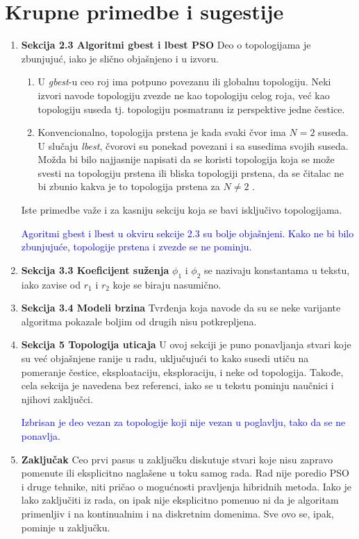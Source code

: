 \documentclass[a4paper]{report}
\newcommand{\odgovor}[1]{\textcolor{blue}{#1}}
\begin{document}
\section{Krupne primedbe i sugestije}
\begin{enumerate}
    \item \textbf{Sekcija 2.3 Algoritmi gbest i lbest PSO} Deo o topologijama je zbunjujuć, iako je slično objašnjeno i u izvoru.
    \begin{enumerate}
        \item U \textit{gbest}-u ceo roj ima potpuno povezanu ili globalnu topologiju. Neki izvori navode topologiju zvezde ne kao topologiju celog roja, već kao topologiju suseda tj. topologiju posmatranu iz perspektive jedne čestice.
        \item Konvencionalno, topologija prstena je kada svaki čvor ima $N=2$ suseda. U slučaju \textit{lbest}, čvorovi su ponekad povezani i sa susedima svojih suseda. Možda bi bilo najjasnije napisati da se koristi topologija koja se može svesti na topologiju prstena ili bliska topologiji prstena, da se čitalac ne bi zbunio kakva je to topologija prstena za $N\neq 2$ .
    \end{enumerate}
    Iste primedbe važe i za kasniju sekciju koja se bavi isključivo topologijama.
    
    
    \odgovor{Agoritmi gbest i lbest u okviru sekcije 2.3 su bolje objašnjeni. Kako ne bi bilo zbunjujuće, topologije prstena i zvezde se ne pominju. } 
    
    
    
    \item \textbf{Sekcija 3.3 Koeficijent suženja} $\phi_1$ i $\phi_2$ se nazivaju konstantama u tekstu, iako zavise od $r_1$ i $r_2$ koje se biraju nasumično.
    
    \item \textbf{Sekcija 3.4 Modeli brzina} Tvrđenja koja navode da su se neke varijante algoritma pokazale boljim od drugih nisu potkrepljena.
    
    \item \textbf{Sekcija 5 Topologija uticaja} U ovoj sekciji je puno ponavljanja stvari koje su već objašnjene ranije u radu, uključujući to kako susedi utiču na pomeranje čestice, eksploataciju, eksploraciju, i neke od topologija. Takođe, cela sekcija je navedena bez referenci, iako se u tekstu pominju naučnici i njihovi zaključci.
    
    \odgovor{Izbrisan je deo vezan za topologije koji nije vezan u poglavlju, tako da se ne ponavlja.  }
    
    \item \textbf{Zaključak} Ceo prvi pasus u zaključku diskutuje stvari koje nisu zapravo pomenute ili eksplicitno naglašene u toku samog rada. Rad nije poredio PSO i druge tehnike, niti pričao o mogućnosti pravljenja hibridnih metoda. Iako je lako zaključiti iz rada, on ipak nije eksplicitno pomenuo ni da je algoritam primenljiv i na kontinualnim i na diskretnim domenima. Sve ovo se, ipak, pominje u zaključku.
\end{enumerate}
\end{document}
